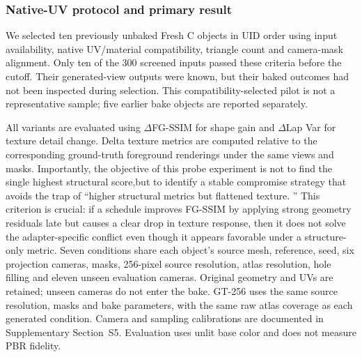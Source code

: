 \documentclass[times,twocolumn,final]{elsarticle}
\providecommand{\DIFadd}[1]{{\protect\color{blue} \sf #1}} %
\providecommand{\DIFdel}[1]{{\protect\color{red} \scriptsize #1}} %
\providecommand{\DIFaddbegin}{} %
\providecommand{\DIFaddend}{} %
\providecommand{\DIFdelbegin}{} %
\providecommand{\DIFdelend}{} %
\begin{document}
\subsubsection{Native-UV protocol and primary result}
\DIFadd{We selected ten previously unbaked Fresh C objects in UID order using input availability, native UV/material compatibility, triangle count and camera-mask alignment. Only ten of the 300 screened inputs passed these criteria before the cutoff. Their generated-view outputs were known, but their baked outcomes had not been inspected during selection. This compatibility-selected pilot is not a representative sample; five earlier bake objects are reported separately}\DIFaddend .

\DIFdelbegin \DIFdel{All variants are evaluated using $\Delta$FG-SSIM for shape gain and $\Delta$Lap Var for texture detail change. Delta texture metrics are computed relative to the corresponding ground-truth foreground renderings under the same views and masks. Importantly, the objective of this probe experiment is not to find the single highest structural score,but to identify a stable compromise strategy that avoids the trap of ``higher structural metrics but flattened texture. '' This criterion is crucial: if a schedule improves FG-SSIM by applying strong geometry residuals late but causes a clear drop in texture response, then it does not solve the adapter-specific conflict even though it appears favorable under a structure-only metric. }\DIFdelend \DIFaddbegin \DIFadd{Seven conditions share each object's source mesh, reference, seed, six projection cameras, masks, 256-pixel source resolution, atlas resolution, hole filling and eleven unseen evaluation cameras. Original geometry and UVs are retained; unseen cameras do not enter the bake. GT-256 uses the same source resolution, masks and bake parameters, with the same raw atlas coverage as each generated condition. Camera and sampling calibrations are documented in Supplementary Section~S5. Evaluation uses unlit base color and does not measure PBR fidelity.
}\DIFaddend
\end{document}

